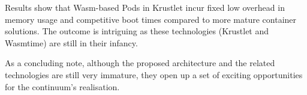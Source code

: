 


Results show that Wasm-based Pods in Krustlet incur fixed low overhead in memory usage and competitive boot times compared to more mature container solutions. The outcome is intriguing as these technologies (Krustlet and Wasmtime) are still in their infancy.

As a concluding note, although the proposed architecture and the related technologies are still very immature, they open up a set of exciting opportunities for the continuum's realisation.
